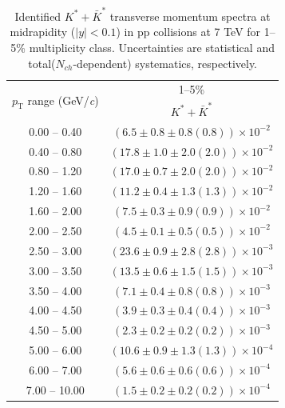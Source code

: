 \begin{table}
\caption{Identified $K^{*} + \bar{K}^{*}$ transverse momentum spectra at midrapidity ($|y|<0.1$) in pp collisions at 7 TeV for 1--5\% multiplicity class. Uncertainties are statistical and total($N_{ch}$-dependent) systematics, respectively.}
\label{tab:KStar_1to5}
\begin{center}
\begin{tabular}{ c | c }
\hline
\multirow{2}{*}{$p_{\mathrm{T}}$ range (GeV/\textit{c})} & \multicolumn{1}{c}{1--5\%} \\ & $K^{*} + \bar{K}^{*}$\\ 
\hline
0.00 -- 0.40 & $(6.5\pm0.8\pm0.8(0.8))\times10^{-2}$ \\ 
0.40 -- 0.80 & $(17.8\pm1.0\pm2.0(2.0))\times10^{-2}$ \\ 
0.80 -- 1.20 & $(17.0\pm0.7\pm2.0(2.0))\times10^{-2}$ \\ 
1.20 -- 1.60 & $(11.2\pm0.4\pm1.3(1.3))\times10^{-2}$ \\ 
1.60 -- 2.00 & $(7.5\pm0.3\pm0.9(0.9))\times10^{-2}$ \\ 
2.00 -- 2.50 & $(4.5\pm0.1\pm0.5(0.5))\times10^{-2}$ \\ 
2.50 -- 3.00 & $(23.6\pm0.9\pm2.8(2.8))\times10^{-3}$ \\ 
3.00 -- 3.50 & $(13.5\pm0.6\pm1.5(1.5))\times10^{-3}$ \\ 
3.50 -- 4.00 & $(7.1\pm0.4\pm0.8(0.8))\times10^{-3}$ \\ 
4.00 -- 4.50 & $(3.9\pm0.3\pm0.4(0.4))\times10^{-3}$ \\ 
4.50 -- 5.00 & $(2.3\pm0.2\pm0.2(0.2))\times10^{-3}$ \\ 
5.00 -- 6.00 & $(10.6\pm0.9\pm1.3(1.3))\times10^{-4}$ \\ 
6.00 -- 7.00 & $(5.6\pm0.6\pm0.6(0.6))\times10^{-4}$ \\ 
7.00 -- 10.00 & $(1.5\pm0.2\pm0.2(0.2))\times10^{-4}$ \\ 
\hline
\end{tabular}
\end{center}
\end{table}
 
